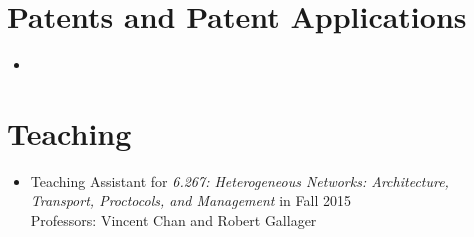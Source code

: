 \documentclass[letterpaper,12pt]{article}
\begin{document}
\section{Patents and Patent Applications}

\begin{itemize}
\item {}
\end{itemize}

\section{Teaching}

\begin{itemize}

\item Teaching Assistant for \emph{6.267: Heterogeneous Networks: Architecture, Transport, Proctocols, and Management} in Fall 2015\\
Professors: Vincent Chan and Robert Gallager

\end{itemize}

%
%
\end{document}
